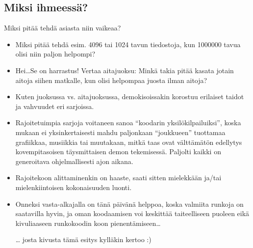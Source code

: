 \documentclass[pdf,10pt]{beamer}
\begin{document}
\subsection{Miksi ihmeessä?}
\begin{frame}{Miksi pitää tehdä asiasta niin vaikeaa?}
  \begin{itemize}
  \item Miksi pitää tehdä esim. 4096 tai 1024 tavun tiedostoja, kun
    1000000 tavua olisi niin paljon helpompi?
  \item Hei\ldots Se on harrastus! Vertaa aitajuoksu: Minkä takia
    pitää kasata jotain aitoja siihen matkalle, kun olisi helpompaa
    juosta ilman aitoja?
  \item Kuten juoksussa vs. aitajuoksussa, demokisoissakin korostuu
    erilaiset taidot ja vahvuudet eri sarjoissa.
  \item Rajoitetuimpia sarjoja voitaneen sanoa ``koodarin
    yksilökilpailuiksi'', koska mukaan ei yksinkertaisesti mahdu
    paljonkaan ``joukkueen'' tuottamaa grafiikkaa, musiikkia tai
    muutakaan, mitkä taas ovat välttämätön edellytys kovempitasoisen
    täysmittaisen demon tekemisessä.  Paljolti kaikki on generoitava
    ohjelmallisesti ajon aikana.
  \item Rajoitekoon alittaminenkin on haaste, saati sitten mielekkään
    ja/tai mielenkiintoisen kokonaisuuden luonti.
  \item Onneksi vasta-alkajalla on tänä päivänä helppoa, koska
    valmiita runkoja on saatavilla hyvin, ja oman koodaamisen voi
    keskittää taiteelliseen puoleen eikä kivuliaaseen runkokoodin koon
    pienentämiseen\ldots
  \item[\ldots] josta kivusta tämä esitys kylläkin kertoo :)
  \end{itemize}
\end{frame}
\end{document}
